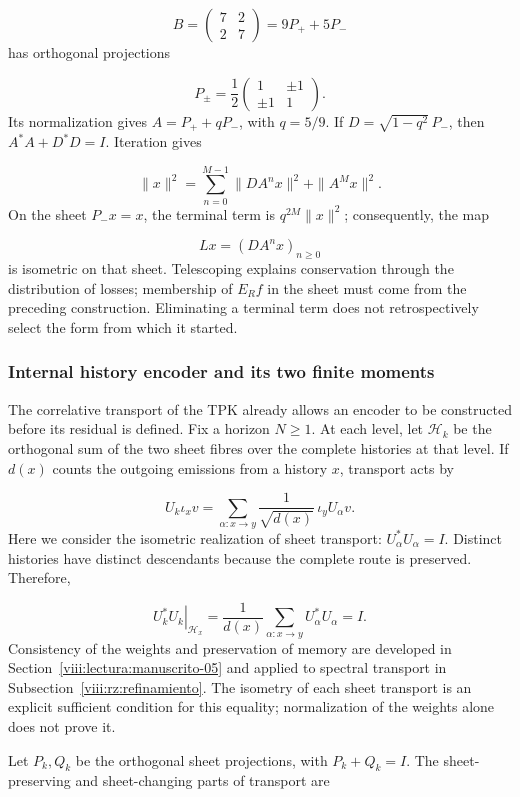 \[
B=\begin{pmatrix}7&2\\2&7\end{pmatrix}=9P_++5P_-
\]
has orthogonal projections

\[
P_\pm=\frac12
\begin{pmatrix}1&\pm1\\\pm1&1\end{pmatrix}.
\]
Its normalization gives \(A=P_++qP_-\), with \(q=5/9\). If \(D=\sqrt{1-q^2}\,P_-\), then \(A^*A+D^*D=I\). Iteration gives

\[
\|x\|^2=\sum_{n=0}^{M-1}\|DA^nx\|^2+\|A^Mx\|^2.
\]
On the sheet \(P_-x=x\), the terminal term is \(q^{2M}\|x\|^2\); consequently, the map

\[
Lx=(DA^nx)_{n\geq0}
\]
is isometric on that sheet. Telescoping explains conservation through the distribution of losses; membership of \(E_Rf\) in the sheet must come from the preceding construction. Eliminating a terminal term does not retrospectively select the form from which it started.

\subsubsection*{Internal history encoder and its two finite moments}
The correlative transport of the TPK already allows an encoder to be constructed before its residual is defined. Fix a horizon \(N\geq1\). At each level, let \(\mathscr H_k\) be the orthogonal sum of the two sheet fibres over the complete histories at that level. If \(d(x)\) counts the outgoing emissions from a history \(x\), transport acts by

\[
U_k\iota_xv=
\sum_{\alpha:x\to y}\frac1{\sqrt{d(x)}}\,\iota_yU_\alpha v.
\]
Here we consider the isometric realization of sheet transport: \(U_\alpha^*U_\alpha=I\). Distinct histories have distinct descendants because the complete route is preserved. Therefore,

\[
\left.U_k^*U_k\right|_{\mathscr H_x}
=\frac1{d(x)}\sum_{\alpha:x\to y}U_\alpha^*U_\alpha=I.
\]
Consistency of the weights and preservation of memory are developed in Section~\ref{viii:lectura:manuscrito-05} and applied to spectral transport in Subsection~\ref{viii:rz:refinamiento}. The isometry of each sheet transport is an explicit sufficient condition for this equality; normalization of the weights alone does not prove it.

Let \(P_k,Q_k\) be the orthogonal sheet projections, with \(P_k+Q_k=I\). The sheet-preserving and sheet-changing parts of transport are

